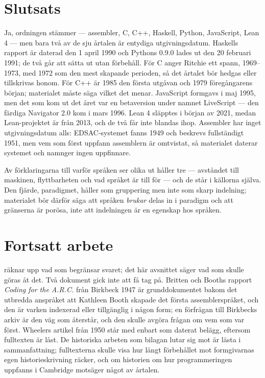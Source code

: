\section{Slutsats}
\label{sec:sprak-slutsats}

Ja, ordningen stämmer --- assembler, C, C++, Haskell, Python, JavaScript,
Lean 4 --- men bara två av de sju årtalen är entydiga utgivningsdatum.
Haskells rapport är daterad den 1 april 1990 och Pythons 0.9.0 lades ut den
20 februari 1991; de två går att sätta ut utan förbehåll.  För C anger
Ritchie ett spann, 1969--1973, med 1972 som den mest skapande perioden, så
det årtalet bör hedgas eller tillskrivas honom.  För C++ är 1985 den första
utgåvan och 1979 föregångarens början; materialet måste säga vilket det
menar.  JavaScript formgavs i maj 1995, men det som kom ut det året var en
betaversion under namnet LiveScript --- den färdiga Navigator 2.0 kom i mars
1996.  Lean 4 släpptes i början av 2021, medan Lean-projektet är från 2013,
och de två får inte blandas ihop.  Assembler har inget utgivningsdatum alls:
EDSAC-systemet fanns 1949 och beskrevs fullständigt 1951, men vem som först
uppfann assemblern är omtvistat, så materialet daterar systemet och namnger
ingen uppfinnare.

Av förklaringarna till varför språken ser olika ut håller tre --- avståndet
till maskinen, flyttbarheten och vad språket är till för --- och de står i
källorna själva.  Den fjärde, paradigmet, håller som gruppering men inte som
skarp indelning; materialet bör därför säga att språken \emph{brukar}
delas in i paradigm och att gränserna är porösa, inte att indelningen är en
egenskap hos språken.

\section{Fortsatt arbete}
\label{sec:sprak-fortsatt}

 räknar upp vad som begränsar svaret; det här
avsnittet säger vad som skulle göras åt det.  Två dokument gick inte att
få tag på.  Britten och Booths rapport \emph{Coding for the A.R.C.} från
Birkbeck 1947 är grunddokumentet bakom det utbredda anspråket att
Kathleen Booth skapade det första assemblerspråket, och den är varken
indexerad eller tillgänglig i någon form; en förfrågan till Birkbecks
arkiv är den väg som återstår, och den skulle avgöra frågan om vem som
var först.  Wheelers artikel från 1950\autocite{Wheeler1950InitialOrders}
står med enbart som daterat belägg, eftersom fulltexten är låst.  De
historiska arbeten som bilagan lutar sig
mot\autocite{CampbellKelly2011Invention,%
Mittlmeier2024HOPL,Priestley2008Logic}
är lästa i sammanfattning; fulltexterna skulle visa hur långt
förbehållet mot formgivarnas egen historieskrivning räcker, och om
historien om hur programmeringen uppfanns i Cambridge motsäger något av
årtalen.

